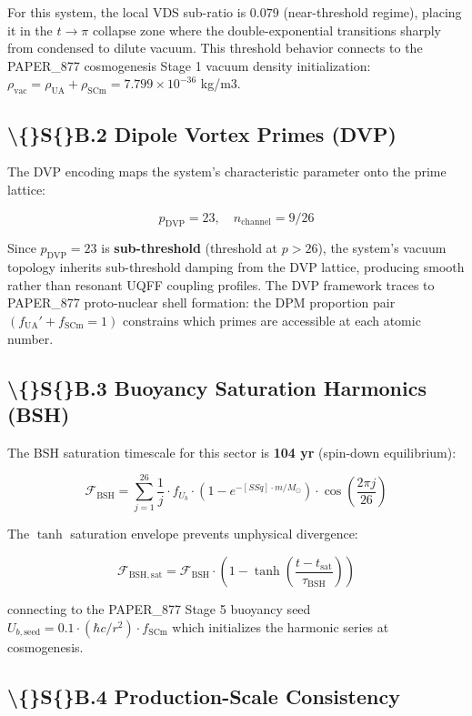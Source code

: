 \documentclass[11pt]{article}
\begin{document}
For this system, the local VDS sub-ratio is $0.079$ (near-threshold regime), placing it in the $t \to \pi$ collapse zone where the double-exponential transitions sharply from condensed to dilute vacuum. This threshold behavior connects to the PAPER\_877 cosmogenesis Stage 1 vacuum density initialization: $\rho_{\mathrm{vac}} = \rho_{\mathrm{UA}} + \rho_{\mathrm{SCm}} = 7.799 \times 10^{-36}$ kg/m3.

\subsection*{\textbackslash\{\}S\{\}B.2 Dipole Vortex Primes (DVP)}

The DVP encoding maps the system's characteristic parameter onto the prime lattice:

$$p_{\mathrm{DVP}} = 23, \quad n_{\mathrm{channel}} = 9/26$$

Since $p_{\mathrm{DVP}} = 23$ is \textbf{sub-threshold} (threshold at $p > 26$), the system's vacuum topology inherits sub-threshold damping from the DVP lattice, producing smooth rather than resonant UQFF coupling profiles. The DVP framework traces to PAPER\_877 proto-nuclear shell formation: the DPM proportion pair $(f_{\mathrm{UA}}' + f_{\mathrm{SCm}} = 1)$ constrains which primes are accessible at each atomic number.

\subsection*{\textbackslash\{\}S\{\}B.3 Buoyancy Saturation Harmonics (BSH)}

The BSH saturation timescale for this sector is \textbf{104 yr} (spin-down equilibrium):

$$\mathcal{F}_{\mathrm{BSH}} = \sum_{j=1}^{26} \frac{1}{j} \cdot f_U_b \cdot \left(1 - e^{-[SSq] \cdot m/M_\odot}\right) \cdot \cos\!\left(\frac{2\pi j}{26}\right)$$

The $\tanh$ saturation envelope prevents unphysical divergence:

$$\mathcal{F}_{\mathrm{BSH,sat}} = \mathcal{F}_{\mathrm{BSH}} \cdot \left(1 - \tanh\!\left(\frac{t - t_{\mathrm{sat}}}{\tau_{\mathrm{BSH}}}\right)\right)$$

connecting to the PAPER\_877 Stage 5 buoyancy seed $U_{b,\mathrm{seed}} = 0.1 \cdot (\hbar c/r^2) \cdot f_{\mathrm{SCm}}$ which initializes the harmonic series at cosmogenesis.

\subsection*{\textbackslash\{\}S\{\}B.4 Production-Scale Consistency}
\end{document}
